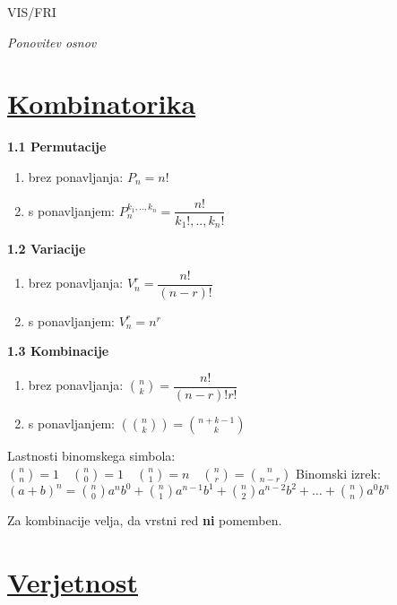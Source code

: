 \documentclass{article}
\begin{document}
\begin{center}
    {\small VIS/FRI \par}
\end{center}

\begin{multicols}{3}

\textit{Ponovitev osnov}

\section{\underline{Kombinatorika}}


\textbf{1.1 Permutacije}
\begin{enumerate}
    \item brez ponavljanja: $P_{n} = n!$
    \item s ponavljanjem: $P_{n}^{k_{1},..,k_{n}} = \dfrac{n!}{k_{1}!,..,k_{n}!}$
\end{enumerate}

\textbf{1.2 Variacije}
\begin{enumerate}
    \item brez ponavljanja: $V_{n}^{r} = \dfrac{n!}{(n - r)!}$
    \item s ponavljanjem: $V_{n}^{r} = n^{r}$
\end{enumerate}

\textbf{1.3 Kombinacije}
\begin{enumerate}
    \item brez ponavljanja: ${n\choose k} = \dfrac{n!}{(n - r)! r!}$
    \item s ponavljanjem: $({n\choose k}) = {n + k - 1\choose k}$
\end{enumerate}
\begin{center}
    Lastnosti binomskega simbola:
    \begin{math}
        {n \choose n} = 1 \quad
        {n \choose 0} = 1 \quad
        {n \choose 1} = n \quad
        {n \choose r} = {n \choose n - r} 
    \end{math}
    Binomski izrek:\\
    \begin{math}
        (a + b)^{n} =
        {n \choose 0} a^{n} b^{0} + {n \choose 1} a^{n - 1} b^{1} +
        {n \choose 2} a^{n - 2} b^{2} + \dots + {n \choose n} a^{0} b^{n}
    \end{math}

\end{center}
Za kombinacije velja, da vrstni red \textbf{ni} pomemben.

\section{\underline{Verjetnost}}



\end{multicols}
\end{document}
